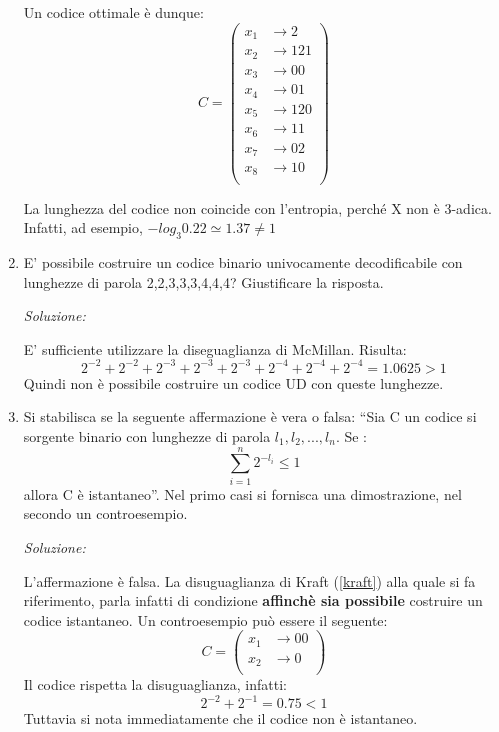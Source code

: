 \begin{enumerate}
      \noindent
      Un codice ottimale è dunque:
       \[ C = \left(
        \begin{array}{cl}
           x_1  & \to 2 \\
           x_2  & \to 121 \\
           x_3  & \to 00 \\
           x_4  & \to 01 \\
           x_5  & \to 120 \\
           x_6  & \to 11 \\
           x_7  & \to 02  \\
           x_8  & \to 10 \\
        \end{array} \right)
       \]

       La lunghezza del codice non coincide con l'entropia, perché X non è 3-adica. Infatti, ad esempio, 
       $-log_3 0.22 \simeq 1.37 \neq 1 $
        \bigskip
\item E' possibile costruire un codice binario univocamente decodificabile con lunghezze di parola 2,2,3,3,3,4,4,4? 
      Giustificare la risposta.
       \bigskip
       \bigskip

       \textit{Soluzione:}

       \noindent
       E' sufficiente utilizzare la diseguaglianza di McMillan. Risulta:
       \[
        2^{-2}+2^{-2}+2^{-3}+2^{-3}+2^{-3}+2^{-4}+2^{-4}+2^{-4}=1.0625>1
       \]
       Quindi non è possibile costruire un codice UD con queste lunghezze.

       \bigskip
\item Si stabilisca se la seguente affermazione è vera o falsa: ``Sia C un codice si sorgente binario con lunghezze 
di parola $l_1,l_2,...,l_n$. Se :
\[
 \sum_{i=1}^n 2^{-l_i} \le 1
\]
allora C è istantaneo''. Nel primo casi si fornisca una dimostrazione, nel secondo un controesempio.
\bigskip
       \bigskip

       \textit{Soluzione:}

       \noindent
       L'affermazione è falsa. La disuguaglianza di Kraft (\ref{kraft}) alla quale si fa riferimento,
        parla infatti di condizione 
       \textbf{affinchè sia possibile} costruire un codice istantaneo. Un controesempio può essere il seguente:
       \[ C = \left(
        \begin{array}{cl}
           x_1  & \to 00 \\
           x_2  & \to 0 \\
        \end{array} \right)
       \]
       Il codice rispetta la disuguaglianza, infatti:
       \[
        2^{-2}+2^{-1}=0.75<1
       \]
       Tuttavia si nota immediatamente che il codice non è istantaneo.


\end{enumerate}
